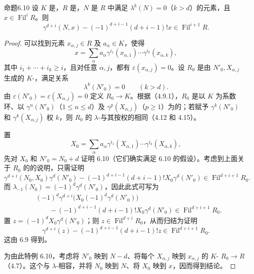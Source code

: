 \begin{SGAresult}{命题}{6.10}
设 $K$ 是，$R$ 是，$N$ 是 $R$ 中满足 $\lambda^k(N)=0$（$k>d$）的元素，且 $x\in\operatorname{Fil}^iR$。则
\[
\gamma^{d+i}(N,x)-(-1)^{d+i-1}(d+i-1)!x
 \in\operatorname{Fil}^{i+1}R.
\]
\end{SGAresult}
\begin{proof}
可以找到元素 $x_{\alpha,j}\in R$ 及 $a_\alpha\in K$，使得
\[
x=\sum_\alpha a_\alpha
 \gamma^{i_1}(x_{\alpha,1})\cdots\gamma^{i_k}(x_{\alpha,k}),
\]
其中 $i_1+\cdots+i_k\geqslant i$，且对任意 $\alpha,j$，都有 $\varepsilon(x_{\alpha,j})=0$。设 $R_0$ 是由 $N'_0,X_{\alpha,j}$ 生成的 $K$-，满足关系
\[
\lambda^k(N'_0)=0\qquad(k>d).
\]
由 $\varepsilon(N'_0)=\varepsilon(X_{\alpha,j})=0$ 定义 $R_0\longrightarrow K$。根据（4.9.1），$R_0$ 是以 $K$ 为系数环、以 $\gamma^n(N'_0)$（$1\leqslant n\leqslant d$）及 $\gamma^p(X_{\alpha,j})$（$p\geqslant1$）为的；若赋予 $\gamma^k(N'_0)$ 和 $\gamma^k(X_{\alpha,j})$ 权 $k$，则 $R_0$ 的 $\lambda$-与其按权的相同（4.12 和 4.15）。

置
\[
X_0=\sum_\alpha a_\alpha
 \gamma^{i_1}(X_{\alpha,1})\cdots\gamma^{i_k}(X_{\alpha,k}),
\]
先对 $X_0$ 和 $N'_0=N_0+d$ 证明 6.10（它们确实满足 6.10 的假设）。考虑到上面关于 $R_0$ 的的说明，只需证明
\[
\gamma^{d+i}(N_0,X_0)\gamma^d(N'_0)
 -(-1)^{d+i-1}(d+i-1)!X_0\gamma^d(N'_0)
 \in\operatorname{Fil}^{d+i+1}R_0.
\]
而 $\lambda_{-1}(N_0)=(-1)^d\gamma^d(N'_0)$，因此此式可写为
\[
\begin{aligned}
{}&(-1)^d\gamma^{d+i}\bigl(X_0(-1)^d\gamma^d(N'_0)\bigr)\\
&\qquad-(-1)^{d+i-1}(d+i-1)!X_0\gamma^d(N'_0)
 \in\operatorname{Fil}^{d+i+1}R_0.
\end{aligned}
\]
置 $z=(-1)^dX_0\gamma^d(N'_0)$；则 $z\in\operatorname{Fil}^{d+i}R_0$，从而归结为证明
\[
\gamma^{d+i}(z)-(-1)^{d+i-1}(d+i-1)!z
 \in\operatorname{Fil}^{d+i+1}R_0.
\]
这由 6.9 得到。

为由此特例 6.10，考虑将 $N'_0$ 映到 $N-d$、将每个 $X_{\alpha,j}$ 映到 $x_{\alpha,j}$ 的 $K$- $R_0\longrightarrow R$（4.7）。这个与 $\lambda$-相容，并将 $N_0$ 映到 $N$、将 $X_0$ 映到 $x$，因而得到结论。
\end{proof}


